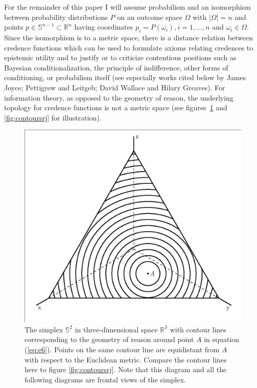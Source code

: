 \documentclass[phd,12pt,oneside]{ubcthesis}
\begin{document}
For the remainder of this paper I will assume probabilism and an
isomorphism between probability distributions $P$ on an outcome space
$\Omega$ with $|\Omega|=n$ and points
$p\in\mathbb{S}^{n-1}\subset\mathbb{R}^{n}$ having coordinates
$p_{i}=P(\omega_{i}),i=1,\ldots,n$ and $\omega_{i}\in{}\Omega$. Since
the isomorphism is to a metric space, there is a distance relation
between credence functions which can be used to formulate axioms
relating credences to epistemic utility and to justify or to criticize
contentious positions such as Bayesian conditionalization, the
principle of indifference, other forms of conditioning, or probabilism
itself (see especially works cited below by James Joyce; Pettigrew and
Leitgeb; David Wallace and Hilary Greaves). For information theory, as
opposed to the geometry of reason, the underlying topology for
credence functions is not a metric space (see
figures~\ref{fig:contourslp} and \ref{fig:contoursrj} for
illustration).

\begin{figure}[ht!]
    \begin{minipage}[h]{.7\linewidth}
      \includegraphics[width=\textwidth]{contourslp.eps}
      \caption{\footnotesize The simplex $\mathbb{S}^{2}$ in
        three-dimensional space $\mathbb{R}^{3}$ with contour lines
        corresponding to the geometry of reason around point $A$ in
        equation (\ref{eq:e6}). Points on the same contour line are
        equidistant from $A$ with respect to the Euclidean metric.
        Compare the contour lines here to figure
        \ref{fig:contoursrj}. Note that this diagram and all the
        following diagrams are frontal views of the simplex.}
      \label{fig:contourslp}
    \end{minipage}
\end{figure}
\end{document}
